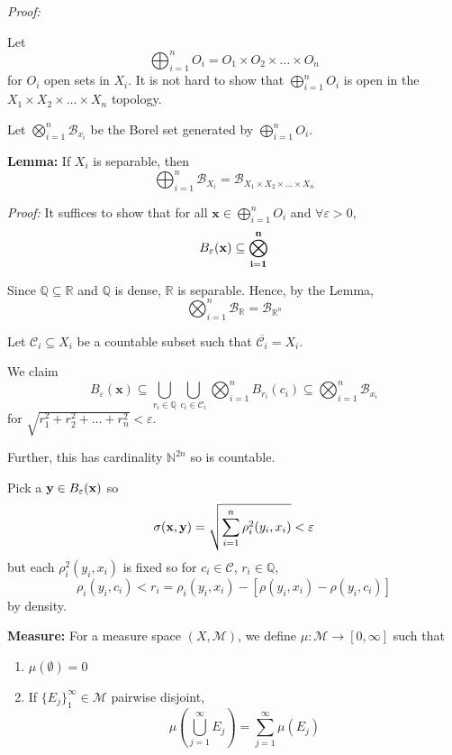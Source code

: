 \documentclass[12pt]{article}
\newcommand{\R}{\mathbb{R}}
\newcommand{\N}{\mathbb{N}}
\newcommand{\Q}{\mathbb{Q}}
\newcommand{\ep}{\varepsilon}
\newcommand{\B}{\mathcal{B}}
\newcommand{\M}{\mathcal{M}}
\newcommand{\sub}{\subseteq}
\renewcommand{\bar}[1]{\overline{#1}}
\newcommand*{\tbf}[1]{\ifmmode\mathbf{#1}\else\textbf{#1}\fi}
\newenvironment*{tbox}[2][gray]{
    \begin{tcolorbox}[
        parbox=false,
        colback=#1!5!white,
        colframe=#1!75!black,
        breakable,
        title={#2}
    ]}
    {\end{tcolorbox}}
\newenvironment*{proof}[1][blue]{
\begin{tcolorbox}[
    parbox=false,
    colback=#1!5!white,
    colframe=#1!75!black,
    breakable
]}
{\end{tcolorbox}}
\begin{document}
    \begin{tbox}{\textbf{Proposition:} $\B_{\R^n}$ is the Borel set generated by $\otimes_{i=1}^n \B_{\R}$}
        \emph{Proof:} 

        Let 
        \[\bigoplus_{i=1}^n O_i = O_1 \times O_2 \times \dots \times O_n\] 
        for $O_i$ open sets in $X_i$. It is not hard to show that $\bigoplus_{i=1}^n O_i$ is open in the $X_1 \times X_2 \times \dots \times X_n$ topology. 

        Let $\bigotimes_{i=1}^n \B_{x_i}$ be the Borel set generated by $\bigoplus_{i=1}^n O_i$. 

        \textbf{Lemma:} If $X_i$ is separable, then 
        \[\bigoplus_{i=1}^n \B_{X_i} = \B_{X_1 \times X_2 \times \dots \times X_n}\]

        \begin{proof}
            \emph{Proof:} It suffices to show that for all $\mathbf x \in \bigoplus_{i=1}^n O_i$ and $\forall \ep >0$,
            \[B_{\ep}(\bf x) \sub \bigotimes_{i=1}^n\]

        \end{proof}

        Since $\Q \sub \R$ and $\Q$ is dense, $\R$ is separable. Hence, by the Lemma, 
        \[\bigotimes_{i=1}^n \B_{\R} = \B_{\R^n}\]

        Let $\mathcal C_i \sub X_i$ be a countable subset such that $\bar{\mathcal C_i} = X_i$. 

        We claim 
        \[B_{\ep}(\mathbf x) \sub \bigcup_{r_i \in \Q} \bigcup_{c_i \in \mathcal C_i} \bigotimes_{i=1}^n B_{r_i}(c_i) \sub \bigotimes_{i=1}^n \B_{x_i}\]
        for $\sqrt{r_1^2 + r_2^2 + \dots + r_n^2} < \ep$. 

        Further, this has cardinality $\N^{2n}$ so is countable. 

        Pick a $\tbf{y} \in B_{\ep}(\tbf{x})$ so 
        \[\sigma(\tbf{x}, \tbf{y}) = \sqrt{\sum_{i=1}^{n} \rho_i^2(y_i, x_i)} < \ep\] 
        but each $\rho_i^2(y_i, x_i)$ is fixed so for $c_i \in \mathcal C$, $r_i \in \Q$, 
        \[\rho_i(y_i, c_i) < r_i = \rho_i(y_i, x_i) - [\rho(y_i, x_i) - \rho(y_i, c_i)]\] 
        by density. 
    \end{tbox}

    \tbf{Measure:} For a measure space $(X, \M)$, we define $\mu: \M \to [0, \infty]$ such that 
    \begin{enumerate}
        \item $\mu(\emptyset) = 0$
        \item If $\{E_j\}_1^{\infty} \in \M$ pairwise disjoint,
        \[\mu\left(\bigcup_{j=1}^\infty E_j\right) = \sum_{j=1}^{\infty} \mu(E_j)\]
    \end{enumerate}
\end{document}
